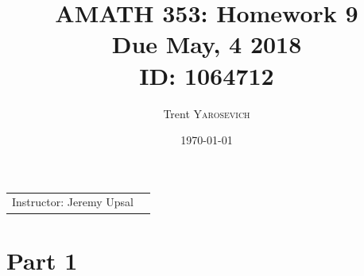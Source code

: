 \documentclass{article}
\title{AMATH 353: Homework 9 \\Due May, 4 2018 \\ ID: 1064712} %
\author{Trent \textsc{Yarosevich}} %
\date{\today} %
\begin{document}
\maketitle %
\setlength\parindent{1cm}

\begin{center}
\begin{tabular}{l r}
Instructor: Jeremy Upsal %
\end{tabular}
\end{center}


\section*{Part 1}
\end{document}
